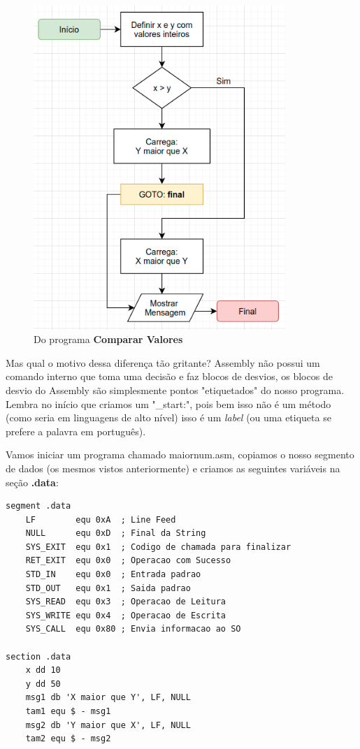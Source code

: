 \begin{figure}[ht]
\begin{minipage}[b]{0.45\linewidth}
		\includegraphics[width=0.85\textwidth]{Pictures/cap01/programa3}
		\caption{Do programa \textbf{Comparar Valores}}
	\end{minipage}
\end{figure}

Mas qual o motivo dessa diferença tão gritante? Assembly não possui um comando interno que toma uma decisão e faz blocos de desvios, os blocos de desvio do Assembly são simplesmente pontos "etiquetados" do nosso programa. Lembra no início que criamos um "\_start:", pois bem isso não é um método (como seria em linguagens de alto nível) isso é um \textit{label} (ou uma etiqueta se prefere a palavra em português).

Vamos iniciar um programa chamado maiornum.asm, copiamos o nosso segmento de dados (os mesmos vistos anteriormente) e criamos as seguintes variáveis na seção \textbf{.data}:
\begin{lstlisting}[]
segment .data
	LF        equ 0xA  ; Line Feed
	NULL      equ 0xD  ; Final da String
	SYS_EXIT  equ 0x1  ; Codigo de chamada para finalizar
	RET_EXIT  equ 0x0  ; Operacao com Sucesso
	STD_IN    equ 0x0  ; Entrada padrao
	STD_OUT   equ 0x1  ; Saida padrao
	SYS_READ  equ 0x3  ; Operacao de Leitura
	SYS_WRITE equ 0x4  ; Operacao de Escrita
	SYS_CALL  equ 0x80 ; Envia informacao ao SO

section .data
	x dd 10
	y dd 50
	msg1 db 'X maior que Y', LF, NULL
	tam1 equ $ - msg1
	msg2 db 'Y maior que X', LF, NULL
	tam2 equ $ - msg2
\end{lstlisting}

